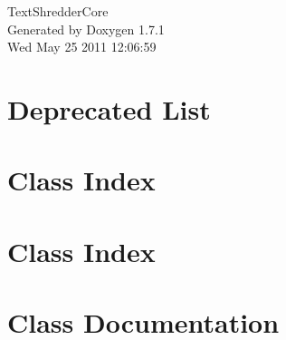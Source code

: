 \documentclass[a4paper]{book}
\begin{document}
\begin{titlepage}
\vspace*{7cm}
\begin{center}
{\Large TextShredderCore }\\
\vspace*{1cm}
{\large Generated by Doxygen 1.7.1}\\
\vspace*{0.5cm}
{\small Wed May 25 2011 12:06:59}\\
\end{center}
\end{titlepage}
\clearemptydoublepage
{}
\tableofcontents
\clearemptydoublepage
{}
\chapter{Deprecated List}
\label{deprecated}

\chapter{Class Index}

\chapter{Class Index}

\chapter{Class Documentation}





































\printindex
\end{document}
